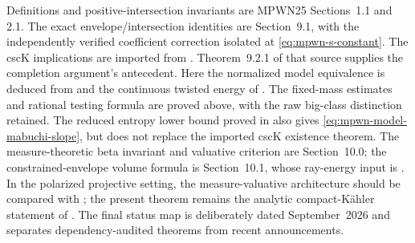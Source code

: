 Definitions and positive-intersection invariants are MPWN25
Sections~1.1 and 2.1.  The exact envelope/intersection identities are
Section~9.1, with the independently verified coefficient correction isolated at \eqref{eq:mpwn-s-constant}.
The cscK implications are imported from
\cite[Theorem~2.4.3 and Corollary~9.2.2]{MPWN25}.
Theorem~9.2.1 of that source supplies the completion argument's
antecedent. Here the normalized model equivalence is deduced from
 and the continuous
twisted energy of \cite[Proposition~4.5]{BJ25FiniteEnergy}.
The fixed-mass estimates and rational testing formula are proved
above, with the raw big-class distinction retained.  The reduced entropy lower bound
proved in  also gives
\eqref{eq:mpwn-model-mabuchi-slope}, but does not replace the imported
cscK existence theorem.  The measure-theoretic beta invariant and valuative
criterion are Section~10.0; the constrained-envelope volume formula is
Section~10.1, whose ray-energy input is
\cite[Theorem~2.6(iii)]{DXZ23}.  In the polarized projective setting, the
measure-valuative architecture should be compared with \cite{BJKS2}; the
present theorem remains the analytic compact-K\"ahler statement of
\cite{MPWN25}.  The final status map is deliberately dated September~2026 and
separates dependency-audited theorems from recent announcements.
